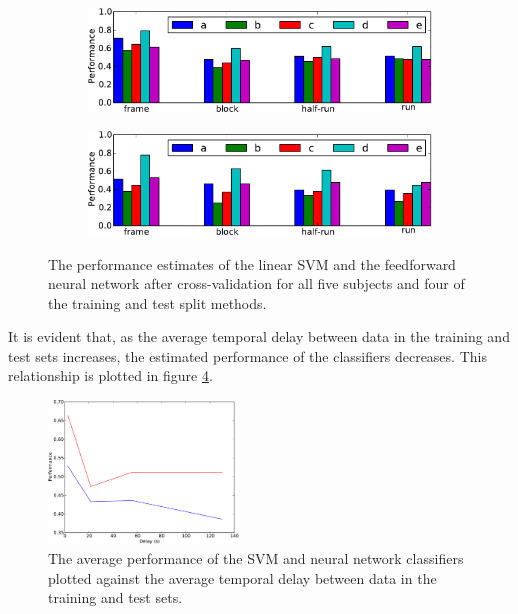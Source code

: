 \documentclass[preprint,5p,authoryear]{elsarticle}
\begin{document}
\begin{figure}
\centering
\begin{subfigure}{0.8\textwidth}
\centering
\includegraphics[width=\textwidth]{figures/svm-performance-graph}
\caption{}
\label{fig:svm-performance-graph}
\end{subfigure}
\begin{subfigure}{0.8\textwidth}
\centering
\includegraphics[width=\textwidth]{figures/nn-performance-graph}
\caption{}
\label{fig:nn-performance-graph}
\end{subfigure}
\caption{The performance estimates of the  linear SVM and the  feedforward neural network after cross-validation for all five subjects and four of the training and test split methods. }
\end{figure}

It is evident that, as the average temporal delay between data in the training and test sets increases, the estimated performance of the classifiers decreases.
This relationship is plotted in figure \ref{fig:performance-verse-temporal-distance}.

\begin{figure}
\centering
\includegraphics[width=0.45\textwidth]{figures/performance-verse-temporal-distance}
\caption{The average performance of the SVM and neural network classifiers plotted against the average temporal delay between data in the training and test sets.}
\label{fig:performance-verse-temporal-distance}
\end{figure}
\end{document}

